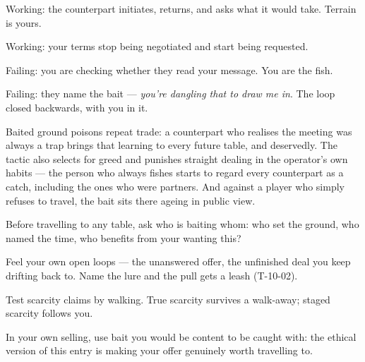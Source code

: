 \begin{feedback}
  \item Working: the counterpart initiates, returns, and asks what it would take. Terrain is yours.
  \item Working: your terms stop being negotiated and start being requested.
  \item Failing: you are checking whether they read your message. You are the fish.
  \item Failing: they name the bait --- \emph{you're dangling that to draw me in}. The loop closed backwards, with you in it.
\end{feedback}
\begin{failure}
Baited ground poisons repeat trade: a counterpart who realises the meeting was always a trap brings that learning to every future table, and deservedly. The tactic also selects for greed and punishes straight dealing in the operator's own habits --- the person who always fishes starts to regard every counterpart as a catch, including the ones who were partners. And against a player who simply refuses to travel, the bait sits there ageing in public view.
\end{failure}
\begin{countermeasures}
  \item Before travelling to any table, ask who is baiting whom: who set the ground, who named the time, who benefits from your wanting this?
  \item Feel your own open loops --- the unanswered offer, the unfinished deal you keep drifting back to. Name the lure and the pull gets a leash (T-10-02).
  \item Test scarcity claims by walking. True scarcity survives a walk-away; staged scarcity follows you.
  \item In your own selling, use bait you would be content to be caught with: the ethical version of this entry is making your offer genuinely worth travelling to.
\end{countermeasures}

\seesources
{}
